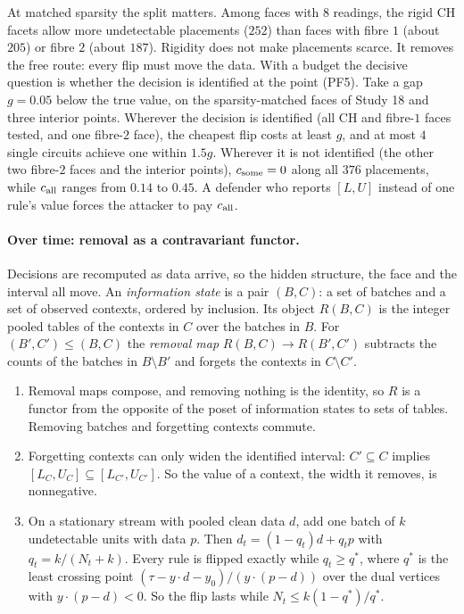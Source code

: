 \documentclass[11pt]{article}
\theoremstyle{definition}\newtheorem{definition}[theorem]{Definition}\newtheorem{remark}[theorem]{Remark}\newtheorem{example}[theorem]{Example}\newtheorem{problem}[theorem]{Open problem}\crefname{problem}{Problem}{Problems}
\begin{document}
At matched sparsity the split matters. Among faces with $8$ readings, the rigid CH facets allow more undetectable placements ($252$) than faces with fibre $1$ (about $205$) or fibre $2$ (about $187$). Rigidity does not make placements scarce. It removes the free route: every flip must move the data. With a budget the decisive question is whether the decision is identified at the point (PF5). Take a gap $g=0.05$ below the true value, on the sparsity-matched faces of Study 18 and three interior points. Wherever the decision is identified (all CH and fibre-$1$ faces tested, and one fibre-$2$ face), the cheapest flip costs at least $g$, and at most $4$ single circuits achieve one within $1.5g$. Wherever it is not identified (the other two fibre-$2$ faces and the interior points), $c_{\rm some}=0$ along all $376$ placements, while $c_{\rm all}$ ranges from $0.14$ to $0.45$. A defender who reports $[L,U]$ instead of one rule's value forces the attacker to pay $c_{\rm all}$.

\paragraph{Over time: removal as a contravariant functor.} Decisions are recomputed as data arrive, so the hidden structure, the face and the interval all move. An \emph{information state} is a pair $(B,C)$: a set of batches and a set of observed contexts, ordered by inclusion. Its object $R(B,C)$ is the integer pooled tables of the contexts in $C$ over the batches in $B$. For $(B',C')\le(B,C)$ the \emph{removal map} $R(B,C)\to R(B',C')$ subtracts the counts of the batches in $B\setminus B'$ and forgets the contexts in $C\setminus C'$.

\begin{proposition}[removal]\label{prop:removal}
\begin{enumerate}
\item[(1)] Removal maps compose, and removing nothing is the identity, so $R$ is a functor from the opposite of the poset of information states to sets of tables. Removing batches and forgetting contexts commute.
\item[(2)] Forgetting contexts can only widen the identified interval: $C'\subseteq C$ implies $[L_C,U_C]\subseteq[L_{C'},U_{C'}]$. So the value of a context, the width it removes, is nonnegative.
\item[(3)] On a stationary stream with pooled clean data $d$, add one batch of $k$ undetectable units with data $p$. Then $d_t=(1-q_t)d+q_tp$ with $q_t=k/(N_t+k)$. Every rule is flipped exactly while $q_t\ge q^*$, where $q^*$ is the least crossing point $(\tau-y\cdot d-y_0)/(y\cdot(p-d))$ over the dual vertices with $y\cdot(p-d)<0$. So the flip lasts while $N_t\le k(1-q^*)/q^*$.
\end{enumerate}
\end{proposition}
\end{document}
